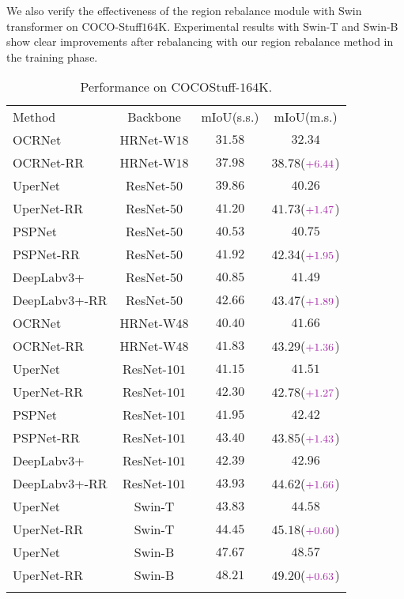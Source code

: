 \documentclass[final]{cvpr}
\begin{document}
We also verify the effectiveness of the region rebalance module with Swin transformer on COCO-Stuff$164$K. Experimental results with Swin-T and Swin-B show clear improvements after rebalancing with our region rebalance method in the training phase. 


\begin{table}[t]
	\centering
	\setlength{\tabcolsep}{2.0pt}
	\caption{Performance on COCOStuff-$164$K.}
	\resizebox{1.00\linewidth}{!}
	{
		\begin{tabular}{l|ccc}
			\shline
			Method &Backbone  &$\mathrm{mIoU}$(s.s.) &$\mathrm{mIoU}$(m.s.) \\
			\shline
			OCRNet               &HRNet-W$18$   &$31.58$ &$32.34$ \\
			OCRNet-RR            &HRNet-W$18$   &$37.98$ &$38.78$($\textcolor{mylight}{+6.44}$) \\
			UperNet              &ResNet-$50$  &$39.86$ &$40.26$ \\
			UperNet-RR           &ResNet-$50$  &$41.20$ &$41.73$($\textcolor{mylight}{+1.47}$) \\
			PSPNet               &ResNet-$50$  &$40.53$ &$40.75$ \\
			PSPNet-RR            &ResNet-$50$  &$41.92$ &$42.34$($\textcolor{mylight}{+1.95}$) \\
			DeepLabv$3$+         &ResNet-$50$  &$40.85$ &$41.49$                \\
			DeepLabv$3$+-RR      &ResNet-$50$  &$42.66$ &$43.47$($\textcolor{mylight}{+1.89}$) \\
			\shline
			OCRNet               &HRNet-W$48$    &$40.40$ &$41.66$ \\
			OCRNet-RR            &HRNet-W$48$    &$41.83$ &$43.29$($\textcolor{mylight}{+1.36}$)\\
			UperNet              &ResNet-$101$  &$41.15$ &$41.51$ \\
			UperNet-RR           &ResNet-$101$  &$42.30$ &$42.78$($\textcolor{mylight}{+1.27}$) \\
			PSPNet               &ResNet-$101$  &$41.95$ &$42.42$ \\
			PSPNet-RR            &ResNet-$101$  &$43.40$ &$43.85$($\textcolor{mylight}{+1.43}$) \\
            DeepLabv$3$+         &ResNet-$101$  &$42.39$ &$42.96$\\
			DeepLabv$3$+-RR      &ResNet-$101$  &$43.93$ &$44.62$($\textcolor{mylight}{+1.66}$) \\
			\shline
			UperNet              &Swin-T         &$43.83$ &$44.58$ \\
			UperNet-RR           &Swin-T         &$44.45$ &$45.18$($\textcolor{mylight}{+0.60}$) \\
			UperNet              &Swin-B\dag     &$47.67$ &$48.57$ \\
			UperNet-RR           &Swin-B\dag     &$48.21$ &$49.20$($\textcolor{mylight}{+0.63}$) \\
			\shline
		\end{tabular}
	}
    \label{tab:main_cocostuff164k}
	\vspace{-0.2in}
\end{table}
\end{document}

